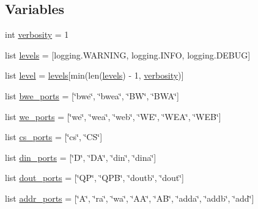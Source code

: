 \subsection*{Variables}
\begin{DoxyCompactItemize}
\item 
int \hyperlink{namespacesrc_1_1memgen_a7cff048d4b6c8e136dc541a7c4c20cb9}{verbosity} = 1
\item 
list \hyperlink{namespacesrc_1_1memgen_a5d7d5179f4134ac1e8b6471f1cf27f87}{levels} = \mbox{[}logging.\-W\-A\-R\-N\-I\-N\-G, logging.\-I\-N\-F\-O, logging.\-D\-E\-B\-U\-G\mbox{]}
\item 
list \hyperlink{namespacesrc_1_1memgen_ac7ae8c0e35d863fc05d43394c8f61b9f}{level} = \hyperlink{namespacesrc_1_1memgen_a5d7d5179f4134ac1e8b6471f1cf27f87}{levels}\mbox{[}min(len(\hyperlink{namespacesrc_1_1memgen_a5d7d5179f4134ac1e8b6471f1cf27f87}{levels}) -\/ 1, \hyperlink{namespacesrc_1_1memgen_a7cff048d4b6c8e136dc541a7c4c20cb9}{verbosity})\mbox{]}
\item 
list \hyperlink{namespacesrc_1_1memgen_a9eced6c2b7295c2a54e7d38418b2e36f}{bwe\-\_\-ports} = \mbox{[}\char`\"{}bwe\char`\"{}, \char`\"{}bwea\char`\"{}, \char`\"{}B\-W\char`\"{}, \char`\"{}B\-W\-A\char`\"{}\mbox{]}
\item 
list \hyperlink{namespacesrc_1_1memgen_a3abad88dc3de0d051d3d1f4c8380e886}{we\-\_\-ports} = \mbox{[}\char`\"{}we\char`\"{}, \char`\"{}wea\char`\"{}, \char`\"{}web\char`\"{}, \char`\"{}W\-E\char`\"{}, \char`\"{}W\-E\-A\char`\"{}, \char`\"{}W\-E\-B\char`\"{}\mbox{]}
\item 
list \hyperlink{namespacesrc_1_1memgen_a3248ebd712c5c181fc31dc2989c6b36a}{cs\-\_\-ports} = \mbox{[}\char`\"{}cs\char`\"{}, \char`\"{}C\-S\char`\"{}\mbox{]}
\item 
list \hyperlink{namespacesrc_1_1memgen_a8857a3c36ad954416e7985d579f88ec5}{din\-\_\-ports} = \mbox{[}\char`\"{}D\char`\"{}, \char`\"{}D\-A\char`\"{}, \char`\"{}din\char`\"{}, \char`\"{}dina\char`\"{}\mbox{]}
\item 
list \hyperlink{namespacesrc_1_1memgen_aeae6c4bd2a1a967c91b883005ed80186}{dout\-\_\-ports} = \mbox{[}\char`\"{}Q\-P\char`\"{}, \char`\"{}Q\-P\-B\char`\"{}, \char`\"{}doutb\char`\"{}, \char`\"{}dout\char`\"{}\mbox{]}
\item 
list \hyperlink{namespacesrc_1_1memgen_a70a3f55f2a4af458e961fe8930d3a35b}{addr\-\_\-ports} = \mbox{[}\char`\"{}A\char`\"{}, \char`\"{}ra\char`\"{}, \char`\"{}wa\char`\"{}, \char`\"{}A\-A\char`\"{}, \char`\"{}A\-B\char`\"{}, \char`\"{}adda\char`\"{}, \char`\"{}addb\char`\"{}, \char`\"{}add\char`\"{}\mbox{]}
\end{DoxyCompactItemize}


